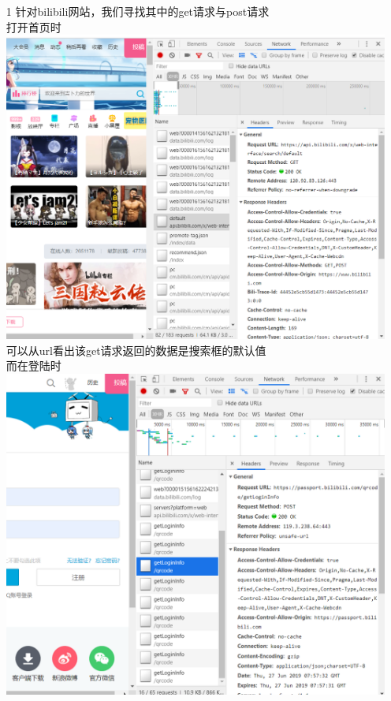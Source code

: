 \documentclass[UTF8]{ctexart}
\begin{document}
    \begin{enumerate}
        \item[1]
        针对bilibili网站，我们寻找其中的get请求与post请求\\        
        打开首页时\\
        \includegraphics[scale=0.4]{06-27_1.png}\\
        可以从url看出该get请求返回的数据是搜索框的默认值\\
        而在登陆时\\
        \includegraphics[scale=0.4]{06-27_2.png}\\

\end{enumerate}
\end{document}
